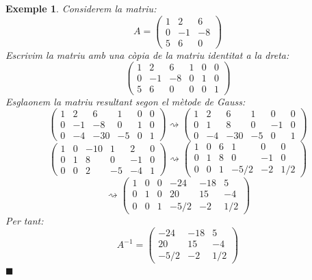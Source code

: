 \documentclass[
  11pt,
]{book}
\numberwithin{dummy}{section}
\theoremstyle{maincolornumbox}
\theoremstyle{blacknumex}
\newtheorem{exampleT}{Exemple}[chapter]
\theoremstyle{blacknumbox}
\theoremstyle{maincolornum}
\newenvironment{example}{\begin{exampleT}}{\hfill{\tiny\ensuremath{\blacksquare}}\end{exampleT}}
\begin{document}
\begin{example}
Considerem la matriu: \[A=\begin{pmatrix}
    1 & 2 & 6 \\ 0 & -1 & -8 \\ 5 & 6 & 0
    \end{pmatrix}\] Escrivim la matriu amb una còpia de la matriu identitat
a la dreta: \[\left(\begin{array}{rrr|rrr}
    1 & 2 & 6 & 1 & 0 & 0 \\
    0 & -1 & -8& 0 & 1 & 0 \\
    5 & 6 & 0 & 0 & 0 & 1
    \end{array}\right)\] Esglaonem la matriu resultant segon el mètode de
Gauss: \[\left(\begin{array}{rrr|rrr}
    1 & 2 & 6 & 1 & 0 & 0\\
    0 & -1 & -8 & 0 & 1 & 0\\
    0 & -4 & -30 & -5 & 0 & 1
    \end{array}\right)
    \rightsquigarrow
    \left(\begin{array}{rrr|rrr}
    1 & 2 & 6 & 1 & 0 & 0\\
    0 & 1 & 8 & 0 & -1 & 0\\
    0 & -4 & -30 & -5 & 0 & 1
    \end{array}\right)\] \[\left(\begin{array}{rrr|rrr}
    1 & 0 & -10  & 1 & 2 & 0\\
    0 &1 & 8 & 0 & -1 & 0\\
    0 & 0 & 2 & -5 & -4 & 1
    \end{array}\right)
    \rightsquigarrow
    \left(\begin{array}{rrr|rrr}
    1 & 0 & 6 & 1 & 0 & 0\\
    0 & 1 & 8 & 0 & -1 & 0\\
    0 & 0 & 1 & -5/2 & -2 & 1/2
    \end{array}\right)\] \[\rightsquigarrow\left(\begin{array}{rrr|rrr}
    1 & 0 & 0 & -24 & -18 & 5\\
    0 & 1 & 0 & 20 & 15 & -4\\
    0 & 0 & 1 & -5/2 & -2 & 1/2
    \end{array}\right)\] Per tant: \[A^{-1}=\begin{pmatrix}
    -24 & -18 & 5 \\
    20 & 15 & -4 \\
    -5/2 & -2 & 1/2
    \end{pmatrix}\]
\end{example}
\end{document}
